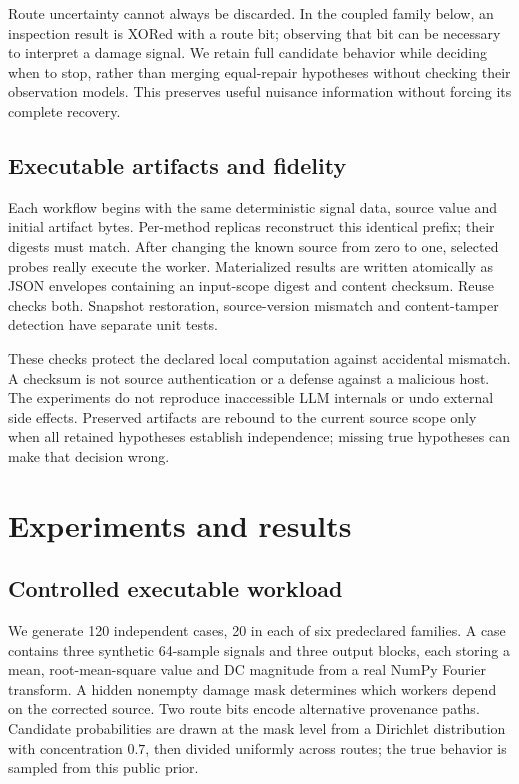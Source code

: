 \documentclass[10pt,letterpaper]{article}
\begin{document}
Route uncertainty cannot always be discarded. In the coupled family below, an inspection result is XORed with a route bit; observing that bit can be necessary to interpret a damage signal. We retain full candidate behavior while deciding when to stop, rather than merging equal-repair hypotheses without checking their observation models. This preserves useful nuisance information without forcing its complete recovery.

\subsection{Executable artifacts and fidelity}
Each workflow begins with the same deterministic signal data, source value and initial artifact bytes. Per-method replicas reconstruct this identical prefix; their digests must match. After changing the known source from zero to one, selected probes really execute the worker. Materialized results are written atomically as JSON envelopes containing an input-scope digest and content checksum. Reuse checks both. Snapshot restoration, source-version mismatch and content-tamper detection have separate unit tests.

These checks protect the declared local computation against accidental mismatch. A checksum is not source authentication or a defense against a malicious host. The experiments do not reproduce inaccessible LLM internals or undo external side effects. Preserved artifacts are rebound to the current source scope only when all retained hypotheses establish independence; missing true hypotheses can make that decision wrong.

\section{Experiments and results}
\subsection{Controlled executable workload}
We generate 120 independent cases, 20 in each of six predeclared families. A case contains three synthetic 64-sample signals and three output blocks, each storing a mean, root-mean-square value and DC magnitude from a real NumPy Fourier transform. A hidden nonempty damage mask determines which workers depend on the corrected source. Two route bits encode alternative provenance paths. Candidate probabilities are drawn at the mask level from a Dirichlet distribution with concentration $0.7$, then divided uniformly across routes; the true behavior is sampled from this public prior.
\end{document}
